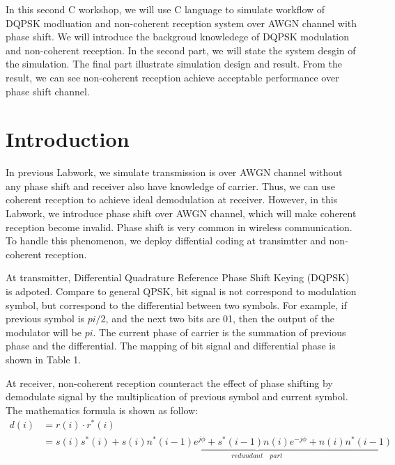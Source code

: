 \documentclass[technicalreport]{ieicej}
\begin{document}
\begin{eabstract}
In this second C workshop, we will use C language to simulate workflow of DQPSK modluation and non-coherent reception system over AWGN channel with phase shift. We will introduce the backgroud knowledege of DQPSK modulation and non-coherent reception. In the second part, we will state the system desgin of the simulation. The final part illustrate simulation design and result. From the result, we can see non-coherent reception achieve acceptable performance over phase shift channel.
\end{eabstract}

\maketitle

\section{Introduction}
In previous Labwork, we simulate transmission is over AWGN channel without any phase shift and receiver also have knowledge of carrier. Thus, we can use coherent reception to achieve ideal demodulation at receiver. However, in this Labwork, we introduce phase shift over AWGN channel, which will make coherent reception become invalid. Phase shift is very common in wireless communication. To handle this phenomenon, we deploy diffential coding at transimtter and non-coherent reception.\par
At transmitter, Differential Quadrature Reference Phase Shift Keying (DQPSK) is adpoted. Compare to general QPSK, bit signal is not correspond to modulation symbol, but correspond to the differential between two symbols. For example, if previous symbol is $pi/2$, and the next two bits are 01, then the output of the modulator will be $pi$. The current phase of carrier is the summation of previous phase and the differential. The mapping of bit signal and differential phase is shown in Table 1.\par
At receiver, non-coherent reception counteract the effect of phase shifting by demodulate signal by the multiplication of previous symbol and current symbol. The mathematics formula is shown as follow:
\begin{equation}
\begin{aligned}
d(i)&=r(i)\cdot r^*(i)\\
&=s(i)s^*(i)+\underbrace{s(i)n^*(i-1)e^{j\phi}+s^*(i-1)n(i)e^{-j\phi}+n(i)n^*(i-1)}_{redundant\quad part}
\end{aligned}
\end{equation}
\end{document}
